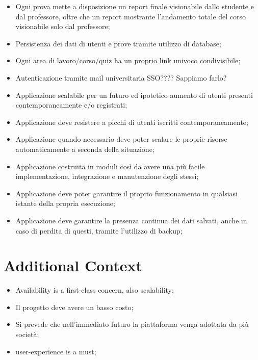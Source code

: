 \documentclass[a4paper,11pt]{report}
\begin{document}
\begin{itemize}
	\item Ogni prova mette a disposizione un report finale visionabile dallo studente e dal professore, oltre che un report mostrante l'andamento totale del corso visionabile solo dal professore;
	\item Persistenza dei dati di utenti e prove tramite utilizzo di database;
	\item Ogni area di lavoro/corso/quiz ha un proprio link univoco condivisibile;
	\item Autenticazione tramite mail universitaria SSO???? Sappiamo farlo?
	\item Applicazione scalabile per un futuro ed ipotetico aumento di utenti presenti contemporaneamente e/o registrati;
	\item Applicazione deve resistere a picchi di utenti iscritti contemporaneamente;
	\item Applicazione quando necessario deve poter scalare le proprie risorse automaticamente a seconda della situazione;
	\item Applicazione costruita in moduli così da avere una più facile implementazione, integrazione e manutenzione degli stessi;
	\item Applicazione deve poter garantire il proprio funzionamento in qualsiasi istante della propria esecuzione;
	\item Applicazione deve garantire la presenza continua dei dati salvati, anche in caso di perdita di questi, tramite l'utilizzo di backup;
	\end{itemize}
	\chapter*{Additional Context}
	\begin{itemize}
		\item Availability is a first-class concern, also scalability;
		\item Il progetto deve avere un basso costo;
		\item Si prevede che nell'immediato futuro la piattaforma venga adottata da più società;
		\item user-experience is a must;
	\end{itemize}
\end{document}
